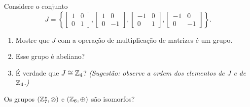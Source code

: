 \documentclass[12pt]{exam}
\begin{document}
    \questao{} Considere o conjunto
    \[
      J = \left\{\begin{bmatrix}
        1 & 0\\0 & 1
      \end{bmatrix}, \begin{bmatrix}
        1 & 0\\0 & -1
      \end{bmatrix}, \begin{bmatrix}
        -1 & 0\\0 & 1
      \end{bmatrix}, \begin{bmatrix}
        -1 & 0\\0 & -1
      \end{bmatrix}\right\}.
    \]
    \begin{enumerate}[label=({\alph*})]
      \item Mostre que $J$ com a opera\c{c}\~ao de multiplica\c{c}\~ao de matrizes \'e um grupo.

      \item Esse grupo \'e abeliano?

      \item É verdade que $J \cong \mathbb{Z}_4$? \textit{(Sugestão: observe a ordem dos elementos de $J$ e de $\mathbb{Z}_4$.)}
    \end{enumerate}

    \vspace{.3cm}

    \questao{} Os grupos $(\mathbb{Z}_7^*, \otimes)$ e $(\mathbb{Z}_6, \oplus)$ s\~ao isomorfos?
\end{document}
